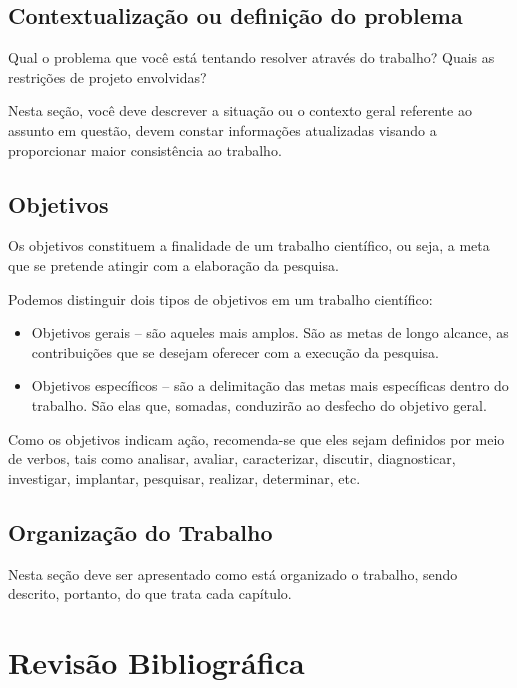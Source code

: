 \documentclass[
	12pt,				%
	openright,			%
	oneside,
	a4paper,				%
	english,				%
	brazil				%
]{abntex2/abntex2} %
\begin{document}
	\section{Contextualização ou definição do problema}

		Qual o problema que você está tentando resolver através do trabalho? Quais
		as restrições de projeto envolvidas?

		Nesta seção, você deve descrever a situação ou o contexto geral referente ao
		assunto em questão, devem constar informações atualizadas visando a
		proporcionar maior consistência ao trabalho.

	\section{Objetivos}

		Os objetivos constituem a finalidade de um trabalho científico, ou seja, a
		meta que se pretende atingir com a elaboração da pesquisa.

		Podemos distinguir dois tipos de objetivos em um trabalho científico:

		\begin{itemize}
			\item Objetivos gerais – são aqueles mais amplos. São as metas de longo alcance, as contribuições que se desejam oferecer com a execução da pesquisa.

			\item Objetivos específicos – são a delimitação das metas mais específicas dentro do trabalho. São elas que, somadas, conduzirão ao desfecho do objetivo geral.
		\end{itemize}

		Como os objetivos indicam ação, recomenda-se que eles sejam definidos por meio de verbos, tais como analisar, avaliar, caracterizar, discutir, diagnosticar, investigar, implantar, pesquisar, realizar, determinar, etc.

	\section{Organização do Trabalho}

		Nesta seção deve ser apresentado como está organizado o trabalho, sendo descrito, portanto, do que trata cada capítulo.


\chapter{Revisão Bibliográfica}
\end{document}
